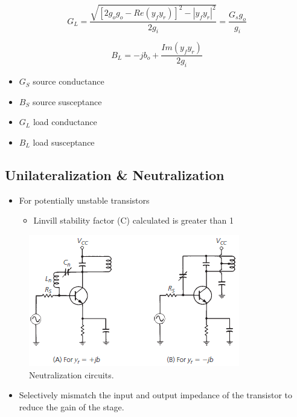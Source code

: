 \begin{equation}
G_L=\dfrac{\sqrt{[2g_og_o-Re(y_fy_r)]^2-|y_fy_r|^2}}{2g_i}=\dfrac{G_sg_o}{g_i}
\end{equation}

\begin{equation}
B_L=-jb_o+\dfrac{Im(y_fy_r)}{2g_i}
\end{equation}

\begin{itemize}
	\item $G_S$ source conductance
	\item $B_S$ source susceptance
	\item $G_L$ load conductance
	\item $B_L$ load susceptance
\end{itemize}

\subsection{Unilateralization \& Neutralization}
\begin{itemize}
	\item For potentially unstable transistors
	\begin{itemize}
		\item Linvill stability factor (C) calculated is greater than 1
	\end{itemize}
\end{itemize}

\begin{figure} [H]
	\centering
	\includegraphics[width=0.6\linewidth]{graphics/41.png}
	\caption{Neutralization circuits.}
	\label{fig:41}
\end{figure}

\begin{itemize}
	\item Selectively mismatch the input and output impedance of the transistor to reduce the gain of the stage.
\end{itemize}


